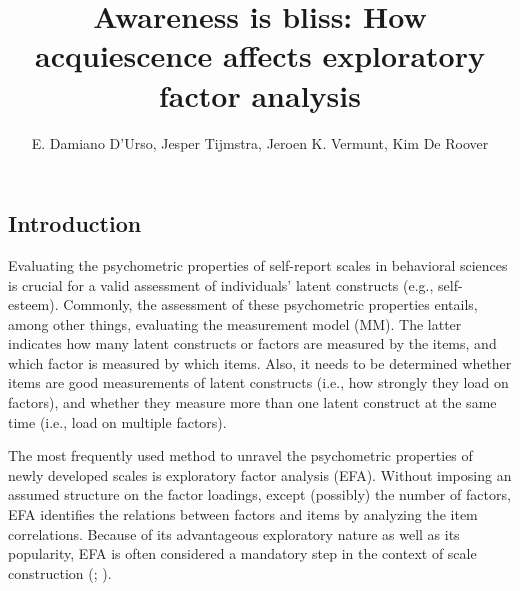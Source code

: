 \documentclass[a4paper,man,natbib]{apa6}
\title{Awareness is bliss: How acquiescence affects exploratory factor analysis}
\author{E. Damiano D'Urso, Jesper Tijmstra, Jeroen K. Vermunt, Kim De Roover}
\affiliation{Tilbug University, The Netherlands}
\begin{document}
	

\begin{linenumbers}
\maketitle
\justifying 


\setcounter{secnumdepth}{4}
\setcounter{section}{0}

\section{Introduction}
\noindent Evaluating the psychometric properties of self-report scales in behavioral sciences is crucial for a valid assessment of individuals' latent constructs (e.g., self-esteem). Commonly, the assessment of these psychometric properties entails, among other things, evaluating the measurement model (MM). The latter indicates how many latent constructs or factors are measured by the items, and which factor is measured by which items. Also, it needs to be determined whether items are good measurements of latent constructs (i.e., how strongly they load on factors), and whether they measure more than one latent construct at the same time (i.e., load on multiple factors).


The most frequently used method to unravel the psychometric properties of newly developed scales is exploratory factor analysis (EFA). Without imposing an assumed structure on the factor loadings, except (possibly) the number of factors, EFA identifies the relations between factors and items by analyzing the item correlations. Because of its advantageous exploratory nature as well as its popularity, EFA is often considered a mandatory step in the context of scale construction (\citealp{howard2016review}; \citealp{goretzko2019exploratory}).


\end{linenumbers}
\end{document}
